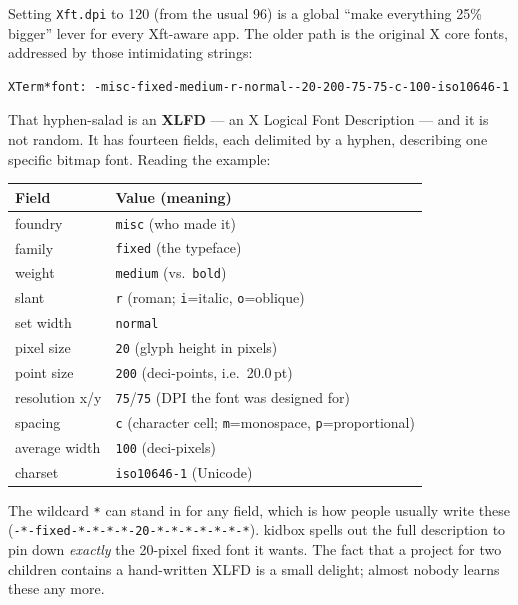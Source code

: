 \documentclass[11pt,oneside]{article}
\newcommand{\code}[1]{\texorpdfstring{\textcolor{kbblue}{\texttt{#1}}}{#1}}
\begin{document}
Setting \code{Xft.dpi} to 120 (from the usual 96) is a global ``make everything
\textsf{25\%} bigger'' lever for every Xft-aware app. The older path is the
original X core fonts, addressed by those intimidating strings:

\begin{lstlisting}
XTerm*font: -misc-fixed-medium-r-normal--20-200-75-75-c-100-iso10646-1
\end{lstlisting}

\begin{deeper}
That hyphen-salad is an \textbf{XLFD} --- an X Logical Font Description --- and it
is not random. It has fourteen fields, each delimited by a hyphen, describing one
specific bitmap font. Reading the example:

\smallskip
\begin{tabular}{@{}ll@{}}
\toprule
\textbf{Field} & \textbf{Value (meaning)}\\
\midrule
foundry        & \texttt{misc} (who made it)\\
family         & \texttt{fixed} (the typeface)\\
weight         & \texttt{medium} (vs.\ \texttt{bold})\\
slant          & \texttt{r} (roman; \texttt{i}=italic, \texttt{o}=oblique)\\
set width      & \texttt{normal}\\
pixel size     & \texttt{20} (glyph height in pixels)\\
point size     & \texttt{200} (deci-points, i.e.\ 20.0\,pt)\\
resolution x/y & \texttt{75}/\texttt{75} (DPI the font was designed for)\\
spacing        & \texttt{c} (character cell; \texttt{m}=monospace, \texttt{p}=proportional)\\
average width  & \texttt{100} (deci-pixels)\\
charset        & \texttt{iso10646-1} (Unicode)\\
\bottomrule
\end{tabular}
\smallskip

The wildcard \texttt{*} can stand in for any field, which is how people usually
write these (\texttt{-*-fixed-*-*-*-*-20-*-*-*-*-*-*-*}). kidbox spells out the
full description to pin down \emph{exactly} the 20-pixel fixed font it wants. The
fact that a project for two children contains a hand-written XLFD is a small
delight; almost nobody learns these any more.
\end{deeper}
\end{document}

